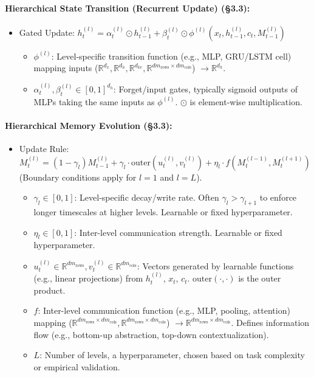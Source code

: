 \documentclass{article}
\begin{document}
\paragraph{Hierarchical State Transition (Recurrent Update) (\S3.3):}
\begin{itemize}
    \item Gated Update: $h_t^{(l)} = \alpha_t^{(l)} \odot h_{t-1}^{(l)} + \beta_t^{(l)} \odot \phi^{(l)}(x_t, h_{t-1}^{(l)}, c_t, M_{t-1}^{(l)})$
        \begin{itemize}
        \item $\phi^{(l)}$: Level-specific transition function (e.g., MLP, GRU/LSTM cell) mapping inputs ($\mathbb{R}^{d_x}, \mathbb{R}^{d_h}, \mathbb{R}^{d_{kv}}, \mathbb{R}^{d m_{\text{rows}} \times d m_{\text{cols}}}$) $\to \mathbb{R}^{d_h}$.
        \item $\alpha_t^{(l)}, \beta_t^{(l)} \in [0, 1]^{d_h}$: Forget/input gates, typically sigmoid outputs of MLPs taking the same inputs as $\phi^{(l)}$. $\odot$ is element-wise multiplication.
        \end{itemize}
\end{itemize}

\paragraph{Hierarchical Memory Evolution (\S3.3):}
\begin{itemize}
    \item Update Rule: $M_t^{(l)} = (1 - \gamma_l) M_{t-1}^{(l)} + \gamma_l \cdot \text{outer}(u_t^{(l)}, v_t^{(l)}) + \eta_l \cdot f(M_t^{(l-1)}, M_t^{(l+1)})$ (Boundary conditions apply for $l=1$ and $l=L$).
        \begin{itemize}
        \item $\gamma_l \in [0, 1]$: Level-specific decay/write rate. Often $\gamma_l > \gamma_{l+1}$ to enforce longer timescales at higher levels. Learnable or fixed hyperparameter.
        \item $\eta_l \in [0, 1]$: Inter-level communication strength. Learnable or fixed hyperparameter.
        \item $u_t^{(l)} \in \mathbb{R}^{d m_{\text{rows}}}, v_t^{(l)} \in \mathbb{R}^{d m_{\text{cols}}}$: Vectors generated by learnable functions (e.g., linear projections) from $h_t^{(l)}$, $x_t$, $c_t$. $\text{outer}(\cdot, \cdot)$ is the outer product.
        \item $f$: Inter-level communication function (e.g., MLP, pooling, attention) mapping ($\mathbb{R}^{d m_{\text{rows}} \times d m_{\text{cols}}}, \mathbb{R}^{d m_{\text{rows}} \times d m_{\text{cols}}}$) $\to \mathbb{R}^{d m_{\text{rows}} \times d m_{\text{cols}}}$. Defines information flow (e.g., bottom-up abstraction, top-down contextualization).
        \item $L$: Number of levels, a hyperparameter, chosen based on task complexity or empirical validation.
        \end{itemize}
\end{itemize}
\end{document}
